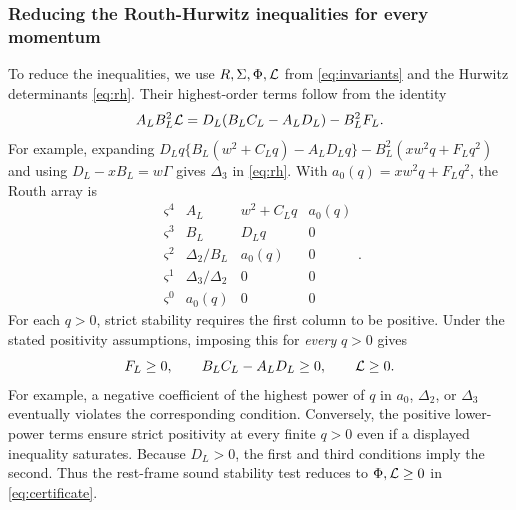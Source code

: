 \subsubsection*{Reducing the Routh-Hurwitz inequalities for every momentum}
To reduce the inequalities, we use $R,\Sigma,\Phi,\mathcal L$ from \eqref{eq:invariants} and the Hurwitz
determinants \eqref{eq:rh}. Their highest-order terms follow from the identity
\begin{equation}\label{app:eq:neutral-design-RH}
 A_LB_L^2\mathcal L=D_L(B_LC_L-A_LD_L)-B_L^2F_L.
\end{equation}
For example, expanding
$D_Lq\{B_L(w^2+C_Lq)-A_LD_Lq\}-B_L^2(xw^2q+F_Lq^2)$
and using $D_L-xB_L=w\Gamma$ gives $\Delta_3$ in \eqref{eq:rh}.
With $a_0(q)=xw^2q+F_Lq^2$, the Routh array is
\begin{equation}
 \begin{array}{c|ccc}
 \varsigma^4&A_L&w^2+C_Lq&a_0(q)\\
 \varsigma^3&B_L&D_Lq&0\\
 \varsigma^2&\Delta_2/B_L&a_0(q)&0\\
 \varsigma^1&\Delta_3/\Delta_2&0&0\\
 \varsigma^0&a_0(q)&0&0
 \end{array}.
\end{equation}
For each $q>0$, strict stability requires the first column to be positive.
Under the stated positivity assumptions, imposing this for
\emph{every} $q>0$ gives
\begin{equation}\label{app:eq:neutral-design-unreduced}
 F_L\geq0,\qquad B_LC_L-A_LD_L\geq0,\qquad \mathcal L\geq0.
\end{equation}
For example, a negative coefficient of the highest power of $q$ in
$a_0$, $\Delta_2$, or $\Delta_3$ eventually violates the corresponding
condition. Conversely, the positive lower-power terms ensure strict
positivity at every finite $q>0$ even if a displayed inequality saturates.
Because $D_L>0$, the first and third conditions imply the second.
Thus the rest-frame sound stability test reduces to
$\Phi,\mathcal L\geq0$ in \eqref{eq:certificate}.

